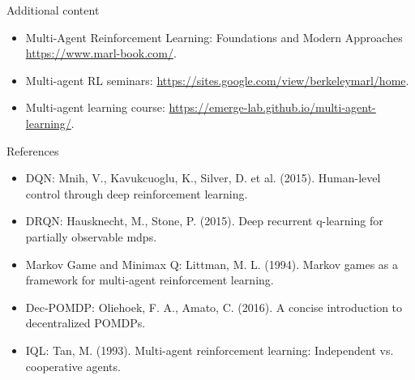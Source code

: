 \documentclass[9pt, hyperref={pdfusetitle,colorlinks=true,allcolors=DarkBlue}]{beamer}
\begin{document}
\begin{frame}{Additional content}

\begin{itemize}
    \item Multi-Agent Reinforcement Learning:
Foundations and Modern Approaches \url{https://www.marl-book.com/}.
\item Multi-agent RL seminars: \url{https://sites.google.com/view/berkeleymarl/home}.
\item Multi-agent learning course: \url{https://emerge-lab.github.io/multi-agent-learning/}.
\end{itemize}

    
\end{frame}

\begin{frame}[plain]{}
\end{frame}


\begin{frame}{References}
\begin{itemize}
    \item DQN: Mnih, V., Kavukcuoglu, K., Silver, D. et al. (2015). Human-level control through deep reinforcement learning.
    \item DRQN: Hausknecht, M., Stone, P. (2015). Deep recurrent q-learning for partially observable mdps.
    \item Markov Game and Minimax Q: Littman, M. L. (1994). Markov games as a framework for multi-agent reinforcement learning.
    \item Dec-POMDP: Oliehoek, F. A., Amato, C. (2016). A concise introduction to decentralized POMDPs.
    \item IQL: Tan, M. (1993). Multi-agent reinforcement learning: Independent vs. cooperative agents.
\end{itemize}
\end{frame}
\end{document}
